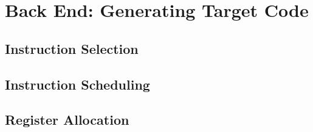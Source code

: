 \section{Back End: Generating Target Code}
\subsection{Instruction Selection}

\subsection{Instruction Scheduling}

\subsection{Register Allocation}
